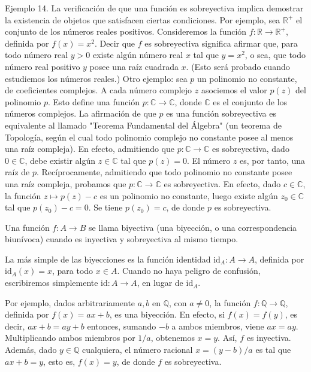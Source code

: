 Ejemplo 14. La verificación de que una función es sobreyectiva implica demostrar la existencia de objetos que satisfacen ciertas condiciones. Por ejemplo, sea \( \mathbb{R}^+ \) el conjunto de los números reales positivos. Consideremos la función \( f: \mathbb{R} \to \mathbb{R}^+ \), definida por \( f(x) = x^2 \). Decir que \( f \) es sobreyectiva significa afirmar que, para todo número real \( y > 0 \) existe algún número real \( x \) tal que \( y = x^2 \), o sea, que todo número real positivo \( y \) posee una raíz cuadrada \( x \). (Esto será probado cuando estudiemos los números reales.) Otro ejemplo: sea \( p \) un polinomio no constante, de coeficientes complejos. A cada número complejo \( z \) asociemos el valor \( p(z) \) del polinomio \( p \). Esto define una función \( p: \mathbb{C} \to \mathbb{C} \), donde \( \mathbb{C} \) es el conjunto de los números complejos. La afirmación de que \( p \) es una función sobreyectiva es equivalente al llamado "Teorema Fundamental del Álgebra" (un teorema de Topología, según el cual todo polinomio complejo no constante posee al menos una raíz compleja). En efecto, admitiendo que \( p: \mathbb{C} \to \mathbb{C} \) es sobreyectiva, dado \( 0 \in \mathbb{C} \), debe existir algún \( z \in \mathbb{C} \) tal que \( p(z) = 0 \). El número \( z \) es, por tanto, una raíz de \( p \). Recíprocamente, admitiendo que todo polinomio no constante posee una raíz compleja, probamos que \( p: \mathbb{C} \to \mathbb{C} \) es sobreyectiva. En efecto, dado \( c \in \mathbb{C} \), la función \( z \mapsto p(z) - c \) es un polinomio no constante, luego existe algún \( z_0 \in \mathbb{C} \) tal que \( p(z_0) - c = 0 \). Se tiene \( p(z_0) = c \), de donde \( p \) es sobreyectiva.

Una función \( f: A \to B \) se llama biyectiva (una biyección, o una correspondencia biunívoca) cuando es inyectiva y sobreyectiva al mismo tiempo.

La más simple de las biyecciones es la función identidad \(\text{id}_A: A \to A\), definida por \(\text{id}_A(x) = x\), para todo \(x \in A\). Cuando no haya peligro de confusión, escribiremos simplemente \(\text{id}: A \to A\), en lugar de \(\text{id}_A\).

Por ejemplo, dados arbitrariamente \(a, b\) en \(\mathbb{Q}\), con \(a \neq 0\), la función \(f: \mathbb{Q} \to \mathbb{Q}\), definida por \(f(x) = ax + b\), es una biyección. En efecto, si \(f(x) = f(y)\), es decir, \(ax + b = ay + b\) entonces, sumando \(-b\) a ambos miembros, viene \(ax = ay\). Multiplicando ambos miembros por \(1/a\), obtenemos \(x = y\). Así, \(f\) es inyectiva. Además, dado \(y \in \mathbb{Q}\) cualquiera, el número racional \(x = (y - b)/a\) es tal que \(ax + b = y\), esto es, \(f(x) = y\), de donde \(f\) es sobreyectiva.

